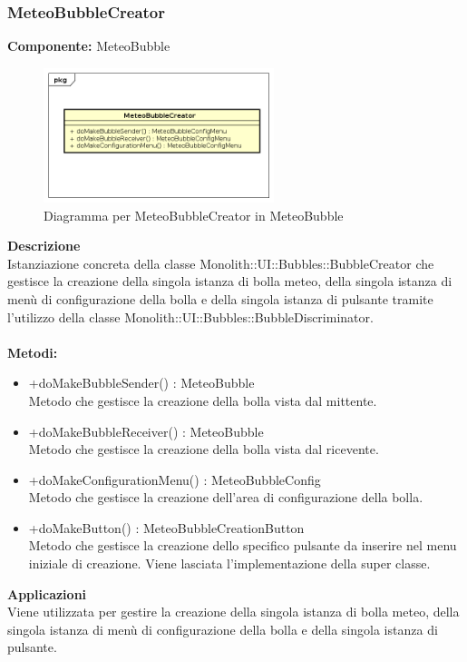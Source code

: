 \subsubsection{MeteoBubbleCreator}
\textbf{Componente:}  MeteoBubble\\
   \FloatBarrier
   \begin{figure}[ht]
   \centering
   \includegraphics[width=0.6\textwidth]{img/single-MeteoBubbleCreator}
   \caption{{Diagramma per MeteoBubbleCreator in MeteoBubble}}
\end{figure}
\FloatBarrier
\textbf{Descrizione}\\
Istanziazione concreta della classe Monolith::UI::Bubbles::BubbleCreator che gestisce la creazione della singola istanza di bolla meteo, della singola istanza di menù di configurazione della bolla e della singola istanza di pulsante tramite l'utilizzo della classe Monolith::UI::Bubbles::BubbleDiscriminator.
\\
\\
\textbf{Metodi:} 
\begin{itemize}
\item +doMakeBubbleSender() : MeteoBubble 
\\
Metodo che gestisce la creazione della bolla vista dal mittente.
\item +doMakeBubbleReceiver() : MeteoBubble 
\\
Metodo che gestisce la creazione della bolla vista dal ricevente.
\item +doMakeConfigurationMenu() : MeteoBubbleConfig 
\\
Metodo che gestisce la creazione dell'area di configurazione della bolla.
\item +doMakeButton() : MeteoBubbleCreationButton 
\\
Metodo che gestisce la creazione dello specifico pulsante da inserire nel menu iniziale di creazione. Viene lasciata l'implementazione della super classe.
\end{itemize} 


\textbf{Applicazioni}\\
Viene utilizzata per gestire la creazione della singola istanza di bolla meteo, della singola istanza di menù di configurazione della bolla e della singola istanza di pulsante. 


